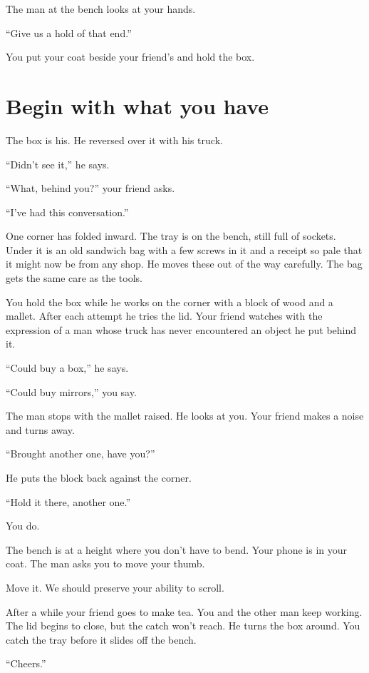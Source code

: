 \documentclass[11pt,oneside]{book}
\begin{document}
The man at the bench looks at your hands.

``Give us a hold of that end.''

You put your coat beside your friend's and hold the box.

\section*{Begin with what you have}

The box is his. He reversed over it with his truck.

``Didn't see it,'' he says.

``What, behind you?'' your friend asks.

``I've had this conversation.''

One corner has folded inward. The tray is on the bench, still full of sockets. Under it is an old sandwich bag with a few screws in it and a receipt so pale that it might now be from any shop. He moves these out of the way carefully. The bag gets the same care as the tools.

You hold the box while he works on the corner with a block of wood and a mallet. After each attempt he tries the lid. Your friend watches with the expression of a man whose truck has never encountered an object he put behind it.

``Could buy a box,'' he says.

``Could buy mirrors,'' you say.

The man stops with the mallet raised. He looks at you. Your friend makes a noise and turns away.

``Brought another one, have you?''

He puts the block back against the corner.

``Hold it there, another one.''

You do.

The bench is at a height where you don't have to bend. Your phone is in your coat. The man asks you to move your thumb.

Move it. We should preserve your ability to scroll.

After a while your friend goes to make tea. You and the other man keep working. The lid begins to close, but the catch won't reach. He turns the box around. You catch the tray before it slides off the bench.

``Cheers.''
\end{document}
